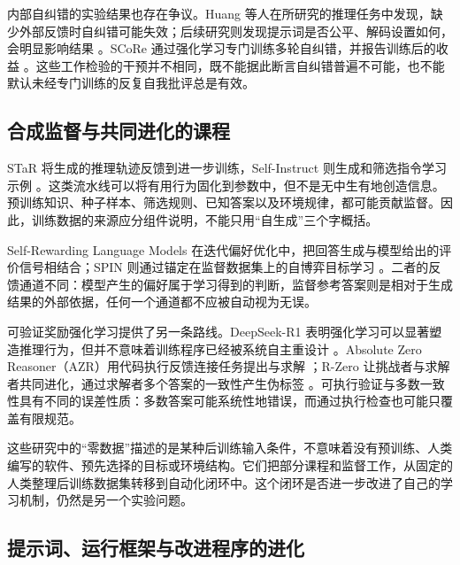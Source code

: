 \documentclass[11pt,,]{article}
\begin{document}
内部自纠错的实验结果也存在争议。Huang
等人在所研究的推理任务中发现，缺少外部反馈时自纠错可能失效；后续研究则发现提示词是否公平、解码设置如何，会明显影响结果
\citep{intrinsic2023, intrinsicpositive2024}。SCoRe
通过强化学习专门训练多轮自纠错，并报告训练后的收益
\citep{score2024}。这些工作检验的干预并不相同，既不能据此断言自纠错普遍不可能，也不能默认未经专门训练的反复自我批评总是有效。

\hypertarget{ux5408ux6210ux76d1ux7763ux4e0eux5171ux540cux8fdbux5316ux7684ux8bfeux7a0b}{%
\subsection{合成监督与共同进化的课程}\label{ux5408ux6210ux76d1ux7763ux4e0eux5171ux540cux8fdbux5316ux7684ux8bfeux7a0b}}

STaR 将生成的推理轨迹反馈到进一步训练，Self-Instruct
则生成和筛选指令学习示例
\citep{star2022, selfinstruct2022}。这类流水线可以将有用行为固化到参数中，但不是无中生有地创造信息。预训练知识、种子样本、筛选规则、已知答案以及环境规律，都可能贡献监督。因此，训练数据的来源应分组件说明，不能只用``自生成''三个字概括。

Self-Rewarding Language Models
在迭代偏好优化中，把回答生成与模型给出的评价信号相结合；SPIN
则通过锚定在监督数据集上的自博弈目标学习
\citep{selfreward2024, spin2024}。二者的反馈通道不同：模型产生的偏好属于学习得到的判断，监督参考答案则是相对于生成结果的外部依据，任何一个通道都不应被自动视为无误。

可验证奖励强化学习提供了另一条路线。DeepSeek-R1
表明强化学习可以显著塑造推理行为，但并不意味着训练程序已经被系统自主重设计
\citep{r12025}。Absolute Zero
Reasoner（AZR）用代码执行反馈连接任务提出与求解 \citep{azr2025}；R-Zero
让挑战者与求解者共同进化，通过求解者多个答案的一致性产生伪标签
\citep{rzero2025}。可执行验证与多数一致性具有不同的误差性质：多数答案可能系统性地错误，而通过执行检查也可能只覆盖有限规范。

这些研究中的``零数据''描述的是某种后训练输入条件，不意味着没有预训练、人类编写的软件、预先选择的目标或环境结构。它们把部分课程和监督工作，从固定的人类整理后训练数据集转移到自动化闭环中。这个闭环是否进一步改进了自己的学习机制，仍然是另一个实验问题。

\hypertarget{ux63d0ux793aux8bcdux8fd0ux884cux6846ux67b6ux4e0eux6539ux8fdbux7a0bux5e8fux7684ux8fdbux5316}{%
\subsection{提示词、运行框架与改进程序的进化}\label{ux63d0ux793aux8bcdux8fd0ux884cux6846ux67b6ux4e0eux6539ux8fdbux7a0bux5e8fux7684ux8fdbux5316}}
\end{document}
